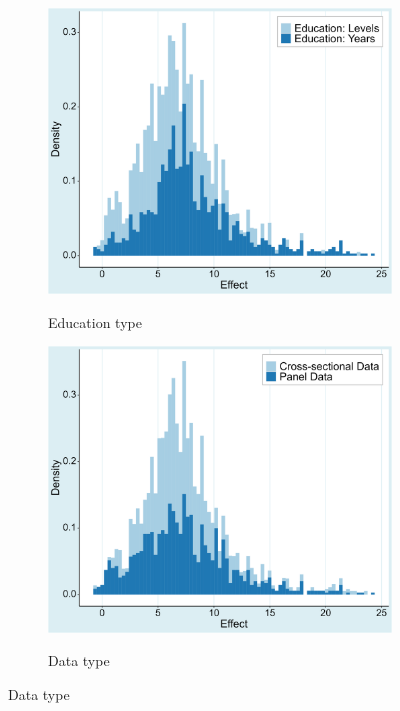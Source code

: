 \begin{figure}[!htbp]
   \begin{center}
      \caption{Graphically observing the effect across subsets of data}
      \label{fig:prima_facie}

      \begin{subfigure}[!htbp]{0.38\textwidth}
         \vspace{-0.1cm}
         \caption{Education type}
         \vspace{-0.1cm}
         \includegraphics[width=0.95\linewidth]{Figures/Prima Facie/prima_facie_years_levels.png}
         \label{fig:prima_facie_years_levels}
      \end{subfigure}
      \begin{subfigure}[!htbp]{0.38\textwidth}
         \vspace{-0.1cm}
         \caption{Data type}
         \vspace{-0.1cm}
         \includegraphics[width=0.95\linewidth]{Figures/Prima Facie/prima_facie_data_type.png}
         \label{fig:prima_facie_data_type}
      \end{subfigure}


\end{center}
\end{figure}
